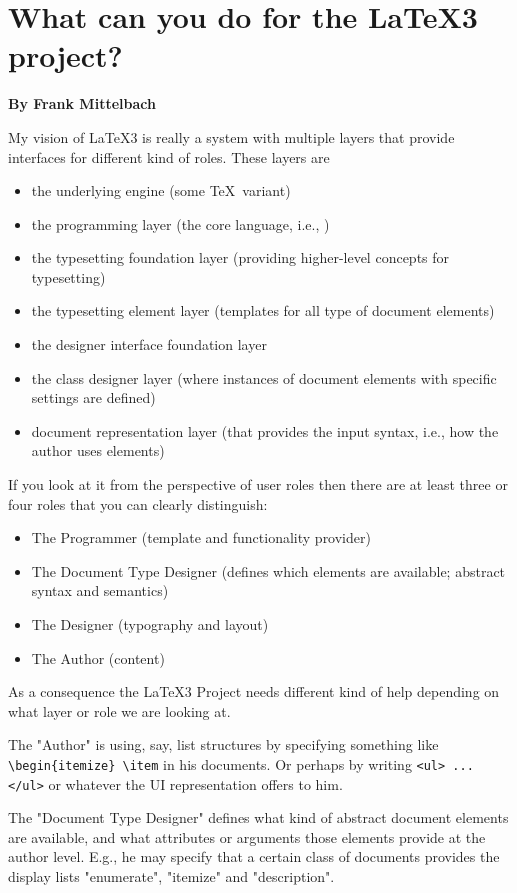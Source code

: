 \documentclass{ltnews}
\begin{document}
\newpage
\section{What can you do for the \LaTeX3 project?}
\textbf{By Frank Mittelbach}

My vision of \LaTeX3 is really a system with multiple layers that provide interfaces for different kind of roles. These layers are
\begin{itemize}
\item the underlying engine (some \TeX\ variant)
\item the programming layer (the core language, i.e., )
\item the typesetting foundation layer (providing higher-level concepts for typesetting)
\item the typesetting element layer (templates for all type of document elements)
\item the designer interface foundation layer
\item the class designer layer (where instances of document elements with specific settings are defined)
\item document representation layer (that provides the input syntax, i.e., how the author uses elements)
\end{itemize}
If you look at it from the perspective of user roles then there are at least three or four roles that you can clearly distinguish:
\begin{itemize}
\item The Programmer (template and functionality provider)
\item The Document Type Designer (defines which elements are available; abstract syntax and semantics)
\item The Designer (typography and layout)
\item The Author (content)
\end{itemize}
As a consequence the \LaTeX3 Project needs different kind of help depending on what layer or role we are looking at.

The "Author" is using, say, list structures by specifying something like \verb"\begin{itemize} \item" in his documents. Or perhaps by writing \Verb|<ul> ... </ul>| or whatever the UI representation offers to him.

The "Document Type Designer" defines what kind of abstract document elements are available, and what attributes or arguments those elements provide at the author level. E.g., he may specify that a certain class of documents provides the display lists "enumerate", "itemize" and "description".
\end{document}
